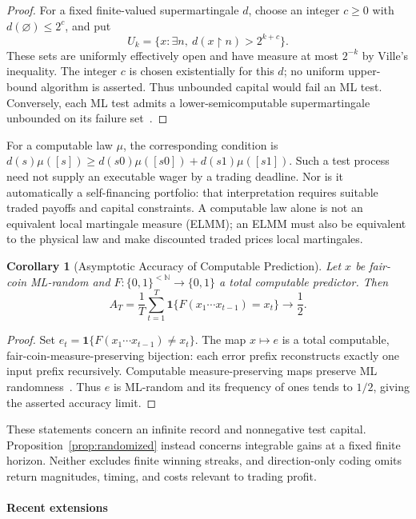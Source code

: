 \documentclass[aps,pra,reprint,superscriptaddress,amsmath,amssymb,floatfix]{revtex4-2}
\theoremstyle{plain}
\newtheorem{corollary}[theorem]{Corollary}
\theoremstyle{definition}
\theoremstyle{remark}
\begin{document}
\begin{proof}
For a fixed finite-valued supermartingale \(d\), choose an integer \(c\geq0\)
with \(d(\varnothing)\leq2^c\), and put
\[
  U_k=\{x:\exists n,\ d(x{\upharpoonright}n)>2^{k+c}\}.
\]
These sets are uniformly effectively open and have measure at most \(2^{-k}\)
by Ville's inequality. The integer \(c\) is chosen existentially for this
\(d\); no uniform upper-bound algorithm is asserted. Thus unbounded capital
would fail an ML test. Conversely, each ML test admits a lower-semicomputable
supermartingale unbounded on its failure set~\cite{calude:02,Nies2009}.
\end{proof}

For a computable law \(\mu\), the corresponding condition is
\(d(s)\mu([s])\geq d(s0)\mu([s0])+d(s1)\mu([s1])\).
Such a test process need not supply an executable wager by a trading deadline.
Nor is it automatically a self-financing portfolio: that interpretation
requires suitable traded payoffs and capital constraints. A computable law
alone is not an equivalent local martingale measure (ELMM); an ELMM must also
be equivalent to the physical law and make discounted traded prices local
martingales.

\begin{corollary}[Asymptotic Accuracy of Computable Prediction]
  \label{cor:prediction-edge}
  Let \(x\) be fair-coin ML-random and
  \(F\colon\{0,1\}^{<\mathbb N}\to\{0,1\}\) a total computable predictor.
  Then
  \[
    A_T=\frac1T\sum_{t=1}^T\mathbf1\{F(x_1\cdots x_{t-1})=x_t\}
    \longrightarrow\frac12.
  \]
\end{corollary}

\begin{proof}
Set \(e_t=\mathbf1\{F(x_1\cdots x_{t-1})\neq x_t\}\). The map
\(x\mapsto e\) is a total computable, fair-coin-measure-preserving bijection:
each error prefix reconstructs exactly one input prefix recursively.
Computable measure-preserving maps preserve ML randomness~\cite{Rute2016}.
Thus \(e\) is ML-random and its frequency of ones tends to \(1/2\), giving
the asserted accuracy limit.
\end{proof}

These statements concern an infinite record and nonnegative test capital.
Proposition~\ref{prop:randomized} instead concerns integrable gains at a fixed
finite horizon. Neither excludes finite winning streaks, and direction-only
coding omits return magnitudes, timing, and costs relevant to trading profit.

\paragraph{Recent extensions}
\end{document}
